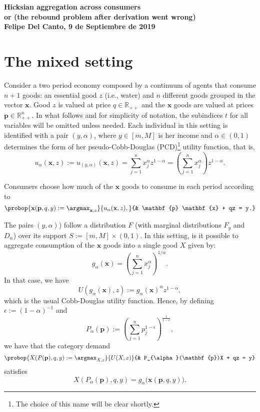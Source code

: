 \documentclass[english, a4paper,12pt]{article}
\begin{document}
\begin{center} \bf \large
	Hicksian aggregation across consumers \\ or (the rebound problem after derivation went wrong) \\ Felipe Del Canto, 9 de Septiembre de 2019
\end{center}

\section{The mixed setting}
Consider a two period economy composed by a continuum of agents that consume $n+1$ goods: an essential good $z$ (i.e., water) and $n$ different goods grouped in the vector $\mathbf{x}$. Good $z$ is valued at price $q \in \mathbb{R}_{++}$ and the $\mathbf{x}$ goods are valued at prices $\mathbf{p} \in \mathbb{R}^{n}_{++}$.  In what follows and for simplicity of notation, the subindices $t$ for all variables will be omitted unless needed. Each individual in this setting is identified with a pair $(y,\alpha)$, where $y \in [m,M]$ is her income and $\alpha \in (0,1)$ determines the form of her pseudo-Cobb-Douglas (PCD)\footnote{The choice of this name will be clear shortly.} utility function, that is,
	$$u_{\alpha}(\mathbf{x},z) := u_{(y,\alpha)}(\mathbf{x},z) = \sum_{j=1}^{n} x_{j}^{\alpha}z^{1-\alpha} = \left(\sum_{j=1}^{n} x_{j}^{\alpha}\right)z^{1-\alpha}.$$

Consumers choose how much of the $\mathbf{x}$ goods to consume in each period according to
	\begin{equation} \label{eq:probdisagg}
		\probop{\mathbf{x}(\mathbf{p}, q, y) 
			:= \argmax_{\mathbf{x}, z}}{u_{\alpha}(\mathbf{x}, z),}
				{&	\mathbf{p} \mathbf{x} + qz = y.}
	\end{equation} 

The pairs $(y,\alpha)$) follow a distribution $F$ (with marginal distributions $F_{y}$ and $D_{\alpha}$) over its support $S := [m,M] \times  (0,1)$. In this setting, is it possible to aggregate consumption of the $\mathbf{x}$ goods into a single good $X$ given by: 
	$$g_{\alpha}(\mathbf{x}) = \left(\sum_{j=1}^{n} x_{j}^{\alpha}\right)^{1/\alpha}.$$
In that case, we have
	$$U(g_{\alpha}(\mathbf{x}), z) := g_{\alpha}(\mathbf{x})^{\alpha}z^{1-\alpha},$$
which is the usual Cobb-Douglas utility function. Hence, by defining $\epsilon := (1-\alpha)^{-1}$ and
	$$P_{\alpha}(\mathbf{p}) :=  \left( \sum_{j=1}^{n} p_{j}^{1-\epsilon} \right)^{\frac{1}{1-\epsilon}},$$
we have that the category demand
	\begin{equation} \label{eq:probagg}
		\probop{X(P(\mathbf{p}), q, y) := \argmax_{X, z}}{U(X,z)}
										{&	P_{\alpha}(\mathbf{p})X + qz = y}
	\end{equation}
satisfies
	\begin{equation} \label{eq:aggequality}
		X(P_{\alpha}(\mathbf{p}), q, y) = g_{\alpha}\big(\mathbf{x}(\mathbf{p}, q, y)\big).
	\end{equation}
\end{document}
